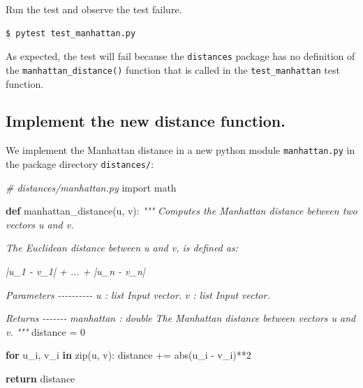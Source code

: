\documentclass[11pt]{article}
\newenvironment{Shaded}{}{}
\newcommand{\KeywordTok}[1]{\textcolor[rgb]{0.00,0.44,0.13}{\textbf{{#1}}}}
\newcommand{\DecValTok}[1]{\textcolor[rgb]{0.25,0.63,0.44}{{#1}}}
\newcommand{\CommentTok}[1]{\textcolor[rgb]{0.38,0.63,0.69}{\textit{{#1}}}}
\newcommand{\NormalTok}[1]{{#1}}
\newcommand{\ImportTok}[1]{{#1}}
\newcommand{\ControlFlowTok}[1]{\textcolor[rgb]{0.00,0.44,0.13}{\textbf{{#1}}}}
\newcommand{\OperatorTok}[1]{\textcolor[rgb]{0.40,0.40,0.40}{{#1}}}
\newcommand{\BuiltInTok}[1]{{#1}}
\begin{document}
    Run the test and observe the test failure.

\begin{verbatim}
$ pytest test_manhattan.py
\end{verbatim}

    As expected, the test will fail because the \texttt{distances} package
has no definition of the \texttt{manhattan\_distance()} function that is
called in the \texttt{test\_manhattan} test function.

    \hypertarget{implement-the-new-distance-function.}{%
\subsection{Implement the new distance
function.}\label{implement-the-new-distance-function.}}

We implement the Manhattan distance in a new python module
\texttt{manhattan.py} in the package directory \texttt{distances/}:

\begin{Shaded}
\begin{Highlighting}[]
\CommentTok{\# distances/manhattan.py}
\ImportTok{import}\NormalTok{ math }

\KeywordTok{def}\NormalTok{ manhattan\_distance(u, v):}
    \CommentTok{"""}
\CommentTok{    Computes the Manhattan distance between two vectors \textasciigrave{}u\textasciigrave{} and \textasciigrave{}v\textasciigrave{}.}

\CommentTok{    The Euclidean distance between \textasciigrave{}u\textasciigrave{} and \textasciigrave{}v\textasciigrave{}, is defined as:}

\CommentTok{    |u\_1 {-} v\_1| + ... + |u\_n {-} v\_n|}

\CommentTok{    Parameters}
\CommentTok{    {-}{-}{-}{-}{-}{-}{-}{-}{-}{-}}
\CommentTok{    u : list}
\CommentTok{        Input vector.}
\CommentTok{    v : list}
\CommentTok{        Input vector.}

\CommentTok{    Returns}
\CommentTok{    {-}{-}{-}{-}{-}{-}{-}}
\CommentTok{    manhattan : double}
\CommentTok{        The Manhattan distance between vectors \textasciigrave{}u\textasciigrave{} and \textasciigrave{}v\textasciigrave{}.}
\CommentTok{    """}
\NormalTok{    distance }\OperatorTok{=} \DecValTok{0}

    \ControlFlowTok{for}\NormalTok{ u\_i, v\_i }\KeywordTok{in} \BuiltInTok{zip}\NormalTok{(u, v):}
\NormalTok{        distance }\OperatorTok{+=} \BuiltInTok{abs}\NormalTok{(u\_i }\OperatorTok{{-}}\NormalTok{ v\_i)}\OperatorTok{**}\DecValTok{2}

    \ControlFlowTok{return}\NormalTok{ distance}
\end{Highlighting}
\end{Shaded}
\end{document}
